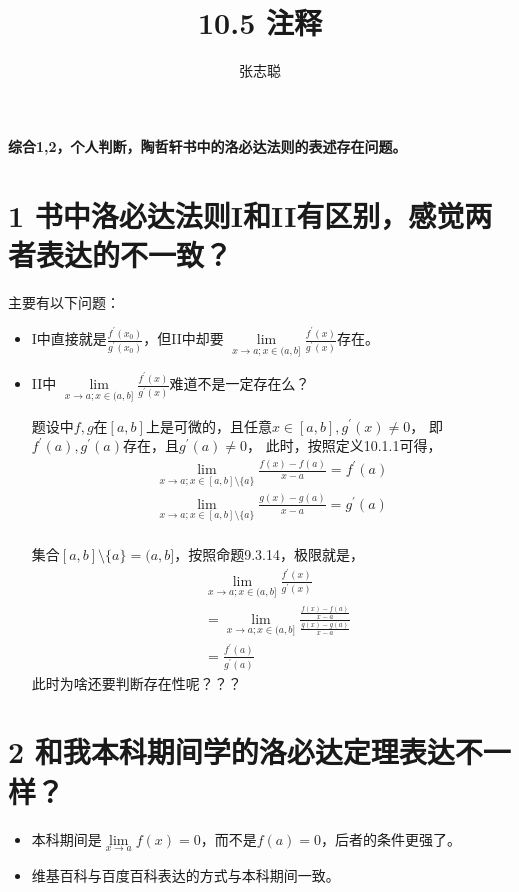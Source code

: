 \documentclass{article}
\begin{document}
\title{10.5 注释}
\author{张志聪}
\maketitle

\begin{zremark}
  \textbf{综合1,2，个人判断，陶哲轩书中的洛必达法则的表述存在问题。}
\end{zremark}

\section*{1 \textbf{书中洛必达法则I和II有区别，感觉两者表达的不一致？}}
主要有以下问题：
\begin{itemize}
  \item I中直接就是$\frac{f^\prime(x_0)}{g^\prime(x_0)}$，但II中却要
        $\lim\limits_{x \to a; x \in (a, b]} \frac{f^\prime(x)}{g^\prime(x)}$存在。
  \item II中
        $\lim\limits_{x \to a; x \in (a, b]} \frac{f^\prime(x)}{g^\prime(x)}$难道不是一定存在么？

        题设中$f,g$在$[a, b]$上是可微的，且任意$x \in [a,b], g^\prime(x) \neq 0$，
        即$f^\prime(a),g^\prime(a)$存在，且$g^\prime(a) \neq 0$，
        此时，按照定义10.1.1可得，
        \begin{align*}
          \lim\limits_{x \to a; x \in [a, b] \setminus \{a\}} \frac{f(x) - f(a)}{x - a}
          = f^\prime(a) \\
          \lim\limits_{x \to a; x \in [a, b] \setminus \{a\}} \frac{g(x) - g(a)}{x - a}
          = g^\prime(a) \\
        \end{align*}

        集合$[a, b] \setminus \{a\} = (a, b]$，按照命题9.3.14，极限就是，
        \begin{align*}
           & \lim\limits_{x \to a; x \in (a, b]} \frac{f^\prime(x)}{g^\prime(x)}                               \\
           & = \lim\limits_{x \to a; x \in (a, b]} \frac{\frac{f(x) - f(a)}{x - a}}{\frac{g(x) - g(a)}{x - a}} \\
           & = \frac{f^\prime(a)}{g^\prime(a)}
        \end{align*}
        此时为啥还要判断存在性呢？？？

\end{itemize}


\section*{2 \textbf{和我本科期间学的洛必达定理表达不一样？}}

\begin{itemize}
  \item 本科期间是$\lim\limits_{x \to a} f(x) = 0$，而不是$f(a) = 0$，后者的条件更强了。
  \item 维基百科与百度百科表达的方式与本科期间一致。
\end{itemize}
\end{document}
